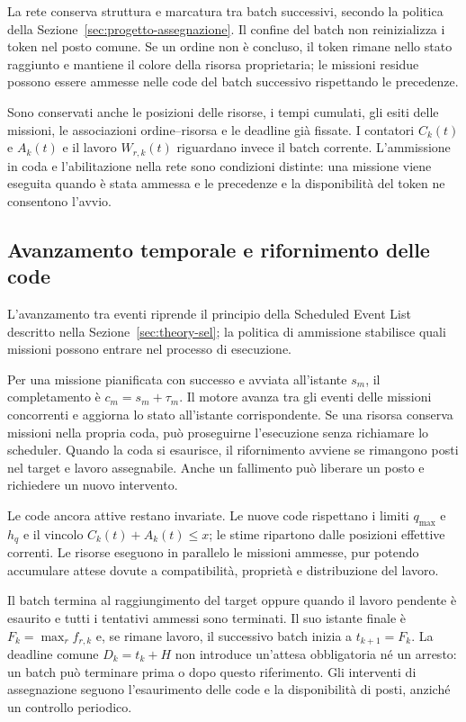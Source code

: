 La rete conserva struttura e marcatura tra batch successivi, secondo la
politica della Sezione~\ref{sec:progetto-assegnazione}. Il confine del batch
non reinizializza i token nel posto comune. Se un ordine non è concluso,
il token rimane nello stato raggiunto e mantiene il colore della risorsa
proprietaria; le missioni residue possono essere ammesse nelle code del
batch successivo rispettando le precedenze.

Sono conservati anche le posizioni delle risorse, i tempi cumulati, gli
esiti delle missioni, le associazioni ordine--risorsa e le deadline già
fissate. I contatori $C_k(t)$ e $A_k(t)$ e il lavoro $W_{r,k}(t)$ riguardano
invece il batch corrente. L'ammissione in coda e l'abilitazione nella rete
sono condizioni distinte: una missione viene eseguita quando è stata
ammessa e le precedenze e la disponibilità del token ne consentono l'avvio.

\subsection{Avanzamento temporale e rifornimento delle code}

L'avanzamento tra eventi riprende il principio della Scheduled Event List
descritto nella Sezione~\ref{sec:theory-sel}; la politica di ammissione
stabilisce quali missioni possono entrare nel processo di esecuzione.

Per una missione pianificata con successo e avviata all'istante $s_m$,
il completamento è $c_m=s_m+\tau_m$. Il motore avanza tra gli eventi
delle missioni concorrenti e aggiorna lo stato all'istante corrispondente.
Se una risorsa conserva missioni nella propria coda, può proseguirne
l'esecuzione senza richiamare lo scheduler. Quando la coda si esaurisce,
il rifornimento avviene se rimangono posti nel target e lavoro assegnabile.
Anche un fallimento può liberare un posto e richiedere un nuovo intervento.

Le code ancora attive restano invariate. Le nuove code rispettano i limiti
$q_{\max}$ e $h_q$ e il vincolo $C_k(t)+A_k(t)\leq x$; le stime ripartono
dalle posizioni effettive correnti. Le risorse eseguono in parallelo le
missioni ammesse, pur potendo accumulare attese dovute a compatibilità,
proprietà e distribuzione del lavoro.

Il batch termina al raggiungimento del target oppure quando il lavoro
pendente è esaurito e tutti i tentativi ammessi sono terminati. Il suo
istante finale è $F_k=\max_r f_{r,k}$ e, se rimane lavoro, il successivo
batch inizia a $t_{k+1}=F_k$. La deadline comune $D_k=t_k+H$ non introduce
un'attesa obbligatoria né un arresto: un batch può terminare prima o dopo
questo riferimento. Gli interventi di assegnazione seguono l'esaurimento
delle code e la disponibilità di posti, anziché un controllo periodico.

